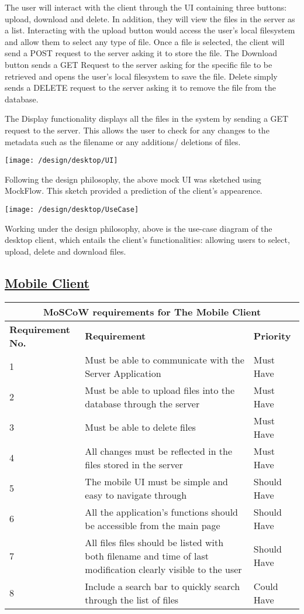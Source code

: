 \documentclass{article}
\begin{document}
The user will interact with the client through the UI containing three buttons: upload, download and delete. In addition, they will view the files in the server as a list. Interacting with the upload button would access the user’s local filesystem and allow them to select any type of file. Once a file is selected, the client will send a POST request to the server asking it to store the file. The Download button sends a GET Request to the server asking for the specific file to be retrieved and opens the user’s local filesystem to save the file. Delete simply sends a DELETE request to the server asking it to remove the file from the database.

The Display functionality displays all the files in the system by sending a GET request to the server. This allows the user to check for any changes to the metadata such as the filename or any additions/ deletions of files.

\texttt{[image: /design/desktop/UI]}

Following the design philosophy, the above mock UI was sketched using MockFlow. This sketch provided a prediction of the client's appearence.

\texttt{[image: /design/desktop/UseCase]}

Working under the design philosophy, above is the use-case diagram of the desktop client, which entails the client's functionalities: allowing users to select, upload, delete and download files.

\subsection{\underline{Mobile Client}}
\begin{tabular}{|p{3cm}|p{5cm}|p{4cm}|}
\hline
\multicolumn{3}{|c|}{\textbf{MoSCoW requirements for The Mobile Client}} \\
\hline
\textbf{Requirement No.} & \textbf{Requirement} & \textbf{Priority}\\
\hline
1 & Must be able to communicate with the Server Application & Must Have \\
\hline
2 & Must be able to upload files into the database through the server & Must Have \\
\hline
3 & Must be able to delete files & Must Have \\
\hline
4 & All changes must be reflected in the files stored in the server & Must Have \\
\hline
5 & The mobile UI must be simple and easy to navigate through & Should Have \\
\hline
6 & All the application's functions should be accessible from the main page & Should Have \\
\hline
7 & All files files should be listed with both filename and time of last modification clearly visible to the user & Should Have \\
\hline
8 & Include a search bar to quickly search through the list of files & Could Have \\
\hline
\end{tabular}
\end{document}
